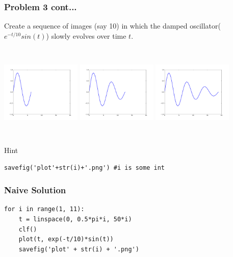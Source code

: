 \documentclass[14pt,compress]{beamer}
\newcounter{time}
\begin{document}
\begin{frame}[fragile]
  \frametitle{Problem 3 cont...}
Create a sequence of images (say 10) in which the damped
oscillator($e^{-t/10}sin(t)$) slowly evolves over time $t$.
\begin{columns}
\includegraphics[width=1.5in,height=1.5in, interpolate=true]{data/exercises/plot2}
\includegraphics[width=1.5in,height=1.5in, interpolate=true]{data/exercises/plot4}
\includegraphics[width=1.5in,height=1.5in, interpolate=true]{data/exercises/plot6}
\end{columns}
\begin{block}{Hint}
\small
  \begin{lstlisting}
savefig('plot'+str(i)+'.png') #i is some int
  \end{lstlisting}
\end{block}
\end{frame}

\begin{frame}[fragile]
  \frametitle{Naive Solution}
\begin{lstlisting}
for i in range(1, 11):
    t = linspace(0, 0.5*pi*i, 50*i)
    clf()
    plot(t, exp(-t/10)*sin(t))
    savefig('plot' + str(i) + '.png')
\end{lstlisting}
\end{frame}
\end{document}
